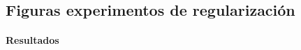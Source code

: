 

\subsection{Figuras experimentos de regularización}
\label{subsec:figuras_experimentos_regularizacion}

\paragraph{Resultados}
\label{par:Resultados-reg2}

